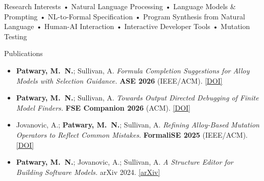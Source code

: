 \documentclass{resume} %
\begin{document}
\begin{rSection}{Research Interests}
    • Natural Language Processing • Language Models \& Prompting • NL-to-Formal Specification
    • Program Synthesis from Natural Language • Human-AI Interaction • Interactive Developer Tools • Mutation Testing
\end{rSection}

\begin{rSection}{Publications}
  \begin{itemize}[noitemsep]
    \item \textbf{Patwary, M.~N.}; Sullivan, A.
          \emph{Formula Completion Suggestions for Alloy Models with Selection Guidance.}
          \textbf{ASE 2026} (IEEE/ACM). \href{https://doi.org/10.1145/3832783.3837517}{[DOI]}
    \item \textbf{Patwary, M.~N.}; Sullivan, A.
          \emph{Towards Output Directed Debugging of Finite Model Finders.}
          \textbf{FSE Companion 2026} (ACM). \href{https://doi.org/10.1145/3803437.3805576}{[DOI]}
    \item Jovanovic, A.; \textbf{Patwary, M.~N.}; Sullivan, A.
          \emph{Refining Alloy-Based Mutation Operators to Reflect Common Mistakes.}
          \textbf{FormaliSE 2025} (IEEE/ACM). \href{https://doi.org/10.1109/FormaliSE66629.2025.00019}{[DOI]}
    \item \textbf{Patwary, M.~N.}; Jovanovic, A.; Sullivan, A.
          \emph{A Structure Editor for Building Software Models.}
          arXiv 2024. \href{https://arxiv.org/abs/2406.09524}{[arXiv]}
  \end{itemize}
\end{rSection}
\end{document}
